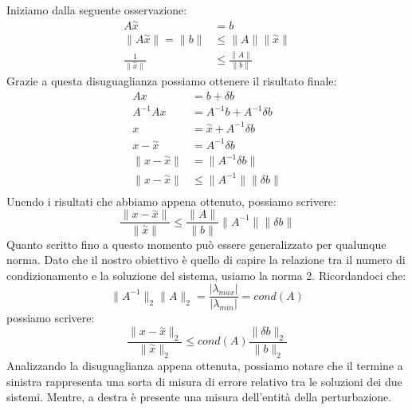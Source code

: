 Iniziamo dalla seguente osservazione:
\begin{equation}
    \begin{aligned}
        A\stackrel{\sim}{x} &= b \\
        \|A\stackrel{\sim}{x}\| = \|b\| &\leq \|A\|\|\stackrel{\sim}{x}\| \\
        \frac{1}{\|\stackrel{\sim}{x}\|} &\leq \frac{\|A\|}{\|b\|}
    \end{aligned}
\end{equation}
Grazie a questa disuguaglianza possiamo ottenere il risultato finale:
\begin{equation}
    \begin{aligned}
        Ax &= b + \delta b \\
        A^{-1}Ax &= A^{-1}b + A^{-1}\delta b\\
        x &= \stackrel{\sim}{x} + A^{-1}\delta b\\
        x - \stackrel{\sim}{x} &= A^{-1}\delta b\\
        \|x - \stackrel{\sim}{x}\| &= \|A^{-1}\delta b\|\\
        \|x - \stackrel{\sim}{x}\| &\leq \|A^{-1}\|\|\delta b\|\\
    \end{aligned}
\end{equation}  
Unendo i risultati che abbiamo appena ottenuto, possiamo scrivere:
\begin{equation}
    \frac{\|x - \stackrel{\sim}{x}\|}{\|\stackrel{\sim}{x}\|} \leq \frac{\|A\|}{\|b\|}\|A^{-1}\|\|\delta b\|
\end{equation}
Quanto scritto fino a questo momento può essere generalizzato per qualunque norma.
Dato che il nostro obiettivo è quello di capire la relazione tra il numero di 
condizionamento e la soluzione del sistema, usiamo la norma 2. Ricordandoci che:
\begin{equation*}
    \|A^{-1}\|_2 \|A\|_2 = \frac{|\lambda_{max}|}{|\lambda_{min}|} = cond(A)
\end{equation*}
possiamo scrivere:
\begin{equation}
    \frac{\|x - \stackrel{\sim}{x}\|_2}{\|\stackrel{\sim}{x}\|_2} \leq cond(A) \frac{\|\delta b\|_2}{\|b\|_2}
\end{equation}
Analizzando la disuguaglianza appena ottenuta, possiamo notare che il termine a 
sinistra rappresenta una sorta di misura di errore relativo tra le soluzioni dei 
due sistemi. Mentre, a destra è presente una misura dell'entità della perturbazione. 
